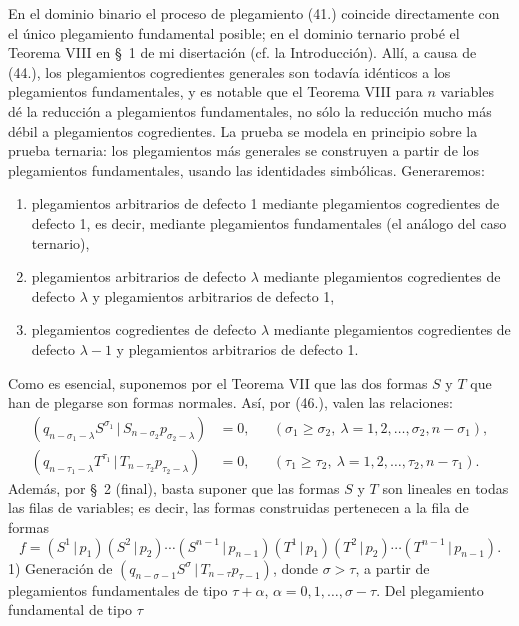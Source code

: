 \documentclass[11pt]{article}
\newcommand{\pair}[2]{(#1\,|\,#2)}
\begin{document}
En el dominio binario el proceso de plegamiento (41.) coincide directamente con el único plegamiento fundamental posible; en el dominio ternario probé el Teorema VIII en \S\ 1 de mi disertación (cf. la Introducción). Allí, a causa de (44.), los plegamientos cogredientes generales son todavía idénticos a los plegamientos fundamentales, y es notable que el Teorema VIII para $n$ variables dé la reducción a plegamientos fundamentales, no sólo la reducción mucho más débil a plegamientos cogredientes. La prueba se modela en principio sobre la prueba ternaria: los plegamientos más generales se construyen a partir de los plegamientos fundamentales, usando las identidades simbólicas. Generaremos:
\begin{enumerate}
\item plegamientos arbitrarios de defecto 1 mediante plegamientos cogredientes de defecto 1, es decir, mediante plegamientos fundamentales (el análogo del caso ternario),
\item plegamientos arbitrarios de defecto $\lambda$ mediante plegamientos cogredientes de defecto $\lambda$ y plegamientos arbitrarios de defecto 1,
\item plegamientos cogredientes de defecto $\lambda$ mediante plegamientos cogredientes de defecto $\lambda-1$ y plegamientos arbitrarios de defecto 1.
\end{enumerate}
Como es esencial, suponemos por el Teorema VII que las dos formas $S$ y $T$ que han de plegarse son formas normales. Así, por (46.), valen las relaciones:
\begin{equation}
\begin{aligned}
\pair{q_{n-\sigma_1-\lambda}S^{\sigma_1}}{S_{n-\sigma_2}p_{\sigma_2-\lambda}}&=0,
&& (\sigma_1\ge\sigma_2,\ \lambda=1,2,\ldots,\sigma_2,n-\sigma_1),\\
\pair{q_{n-\tau_1-\lambda}T^{\tau_1}}{T_{n-\tau_2}p_{\tau_2-\lambda}}&=0,
&& (\tau_1\ge\tau_2,\ \lambda=1,2,\ldots,\tau_2,n-\tau_1).
\end{aligned}
\tag{62}
\end{equation}
Además, por \S\ 2 (final), basta suponer que las formas $S$ y $T$ son lineales en todas las filas de variables; es decir, las formas construidas pertenecen a la fila de formas
\[
 f=\pair{S^1}{p_1}\pair{S^2}{p_2}\cdots\pair{S^{n-1}}{p_{n-1}}
   \pair{T^1}{p_1}\pair{T^2}{p_2}\cdots\pair{T^{n-1}}{p_{n-1}}.
\]
1) Generación de $\pair{q_{n-\sigma-1}S^\sigma}{T_{n-\tau}p_{\tau-1}}$, donde $\sigma>\tau$, a partir de plegamientos fundamentales de tipo $\tau+\alpha$, $\alpha=0,1,\ldots,\sigma-\tau$. Del plegamiento fundamental de tipo $\tau$
\end{document}
